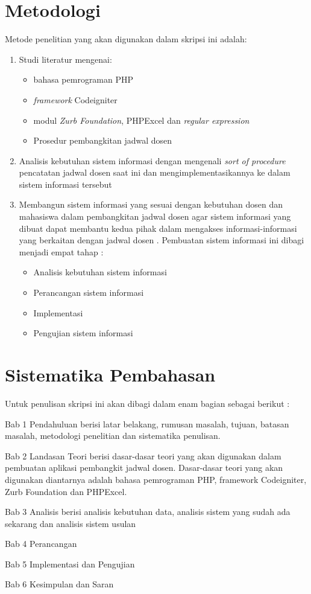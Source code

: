 \section{Metodologi}
\label{sec:metlit}
Metode penelitian yang akan digunakan dalam skripsi ini adalah:
\begin{enumerate}
   \item Studi literatur mengenai:
   		\begin{itemize}
 		\item bahasa pemrograman PHP
 		\item \textit{framework} Codeigniter
 		\item modul \textit{Zurb Foundation}, PHPExcel dan \textit{regular expression}
 		\item Prosedur pembangkitan jadwal dosen
		\end{itemize}
   \item Analisis kebutuhan sistem informasi dengan mengenali \textit{sort of procedure} pencatatan jadwal dosen saat ini dan mengimplementasikannya ke dalam sistem informasi tersebut
    \item Membangun sistem informasi yang sesuai dengan kebutuhan dosen dan mahasiswa dalam pembangkitan jadwal dosen agar sistem informasi yang dibuat dapat membantu kedua pihak dalam mengakses informasi-informasi yang berkaitan dengan jadwal dosen . Pembuatan sistem informasi ini dibagi menjadi empat tahap :
    	\begin{itemize}
 		\item Analisis kebutuhan sistem informasi 
 		\item Perancangan sistem informasi
 		\item Implementasi 
 		\item Pengujian sistem informasi
		\end{itemize}
\end{enumerate}
 


\section{Sistematika Pembahasan}
\label{sec:sispem}
Untuk penulisan skripsi ini akan dibagi dalam enam bagian sebagai berikut :

Bab 1 Pendahuluan berisi latar belakang, rumusan masalah, tujuan, batasan masalah,  metodologi penelitian dan sistematika penulisan.

Bab 2 Landasan Teori berisi dasar-dasar teori yang akan digunakan dalam pembuatan aplikasi pembangkit jadwal dosen. Dasar-dasar teori yang akan digunakan diantarnya adalah bahasa pemrograman PHP, framework Codeigniter, Zurb Foundation dan PHPExcel.

Bab 3 Analisis berisi analisis kebutuhan data, analisis sistem yang sudah ada sekarang dan analisis sistem usulan

Bab 4 Perancangan

Bab 5 Implementasi dan Pengujian

Bab 6 Kesimpulan dan Saran


